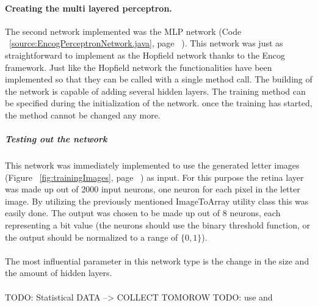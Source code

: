 \documentclass[pdftex,a4paper,12pt,twoside]{report}
\theoremstyle{plain} \newtheorem{theorem}{Theorem} \newtheorem{proposition}{Proposition} \newtheorem{lemma}{Lemma} \newtheorem*{corollary}{Corollary}
\theoremstyle{definition} \newtheorem{definition}{Definition} \newtheorem{conjecture}{Conjecture} \newtheorem*{example}{Example} \newtheorem{algorithm}{Algorithm}
\theoremstyle{remark} \newtheorem*{remark}{Remark} \newtheorem*{note}{Note} \newtheorem{case}{Case}
\begin{document}
\paragraph{Creating the multi layered perceptron.}
The second network implemented was the MLP network (Code ~\ref{source:EncogPerceptronNetwork.java}, page ~\pageref{source:EncogPerceptronNetwork.java}). This network was just as straightforward to implement as the Hopfield network thanks to the Encog framework. Just like the Hopfield network the functionalities have been implemented so that they can be called with a single method call. The building of the network is capable of adding several hidden layers. The training method can be specified during the initialization of the network. once the training has started, the method cannot be changed any more.
\subparagraph{Testing out the network}
This network was immediately implemented to use the generated letter images (Figure ~\ref{fig:trainingImages}, page ~\pageref{fig:trainingImages}) as input. For this purpose the retina layer was made up out of 2000 input neurons, one neuron for each pixel in the letter image. By utilizing the previously mentioned ImageToArray utility class this was easily done. The output was chosen to be made up out of 8 neurons, each representing a bit value (the neurons should use the binary threshold function, or the output should be normalized to a range of $\{0,1\}$).\\\\The most influential parameter in this network type is the change in the size and the amount of hidden layers.
\\\\
TODO: Statistical DATA --> COLLECT TOMOROW
TODO: use \citep{Jiang2003} and \citep{Browning2007}
\end{document}
